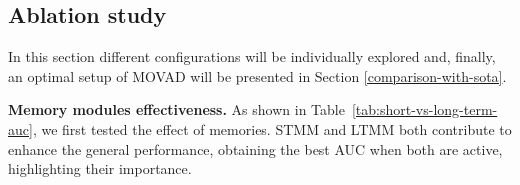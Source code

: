 \subsection{Ablation study}
In this section different configurations will be individually explored and, finally, an optimal setup of MOVAD will be presented in Section \ref{comparison-with-sota}.

\noindent\textbf{Memory modules effectiveness.}
As shown in Table~\ref{tab:short-vs-long-term-auc}, we first tested the effect of memories.
STMM and LTMM both contribute to enhance the general performance, obtaining the best AUC when both are active, highlighting their importance. 


